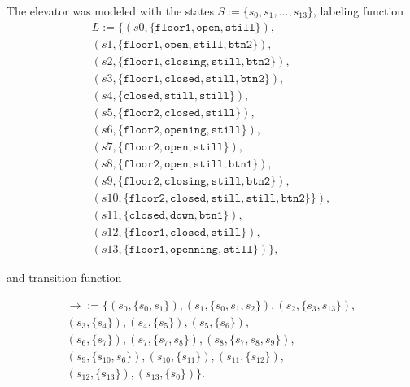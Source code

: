\documentclass[a4paper, 11pt]{article}
\begin{document}
   The elevator was modeled with the states $S := \{s_0, s_1,
   \dots, s_{13}\}$, labeling function
   \begin{equation*}
   \begin{split}
   L := \{ 
   (s0, \{\texttt{floor1}, \texttt{open}, \texttt{still}\}),
      \\
   (s1, \{\texttt{floor1}, \texttt{open}, \texttt{still},
      \texttt{btn2}\}), \\
   (s2, \{\texttt{floor1}, \texttt{closing}, \texttt{still},
      \texttt{btn2} \}), \\
   (s3, \{\texttt{floor1}, \texttt{closed}, \texttt{still},
      \texttt{btn2}\}), \\
   (s4, \{\texttt{closed}, \texttt{still}, \texttt{still}\}),
      \\
   (s5, \{\texttt{floor2}, \texttt{closed}, \texttt{still}\}),
      \\
   (s6, \{\texttt{floor2}, \texttt{opening},
      \texttt{still}\}), \\
   (s7, \{\texttt{floor2}, \texttt{open}, \texttt{still}\}), 
      \\
   (s8, \{\texttt{floor2}, \texttt{open}, \texttt{still},
      \texttt{btn1}\}), \\
   (s9, \{\texttt{floor2}, \texttt{closing}, \texttt{still},
      \texttt{btn2}\}), \\
   (s10, \{\texttt{floor2}, \texttt{closed}, \texttt{still},
      \texttt{still}, \texttt{btn2}\}\}), \\
   (s11, \{\texttt{closed}, \texttt{down}, \texttt{btn1}\}),
      \\
   (s12, \{\texttt{floor1}, \texttt{closed},
      \texttt{still}\}), \\
   (s13, \{\texttt{floor1}, \texttt{openning},
      \texttt{still}\})
   \},
   \end{split}
   \end{equation*}

   and transition function

   \begin{equation*}
   \begin{split}
   \rightarrow := \{ 
   (s_0, \{s_0, s_1\}), (s_1, \{s_0, s_1, s_2\}), 
      (s_2, \{s_3, s_{13}\}), \\
   (s_3, \{s_4\}), (s_4, \{s_5\}), (s_5, \{s_6\}), \\
   (s_6, \{s_7\}), (s_7, \{s_7, s_8\}), 
      (s_8, \{s_7, s_8, s_9\}), \\
   (s_9, \{s_{10}, s_6\}), (s_{10}, \{s_{11}\}), 
      (s_{11}, \{s_{12}\}), \\
   (s_{12}, \{s_{13}\}), (s_{13}, \{s_0\})
   \}.
   \end{split}
   \end{equation*}
\end{document}
